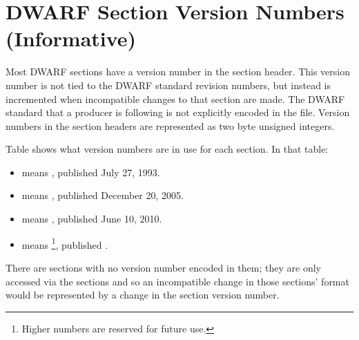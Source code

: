 
\chapter[Section Version Numbers (Informative)]{DWARF Section Version Numbers (Informative)}
\label{app:dwarfsectionversionnumbersinformative}


Most DWARF sections have a version number in the section
header. This version number is not tied to the DWARF standard
revision numbers, but instead is incremented when incompatible
changes to that section are made. The DWARF standard that
a producer is following is not explicitly encoded in the
file. Version numbers in the section headers are represented
as two byte unsigned integers. 

Table 
shows what version
numbers are in use for each section. In that table:
\begin{itemize}
\setlength{\itemsep}{0em}
\item  {} means , published July 27, 1993.
\item  {} means , published December 20, 2005.
\item  {} means , published June 10, 2010.
\item  {} means \footnote{Higher numbers are reserved for future use.}, published 
			.
\end{itemize}

There are sections with no version number encoded in them;
they are only accessed via the 
\dotdebuginfo{} 
sections and so an incompatible change in those sections'
format would be represented by a change in the 
\dotdebuginfo{} section version number.

